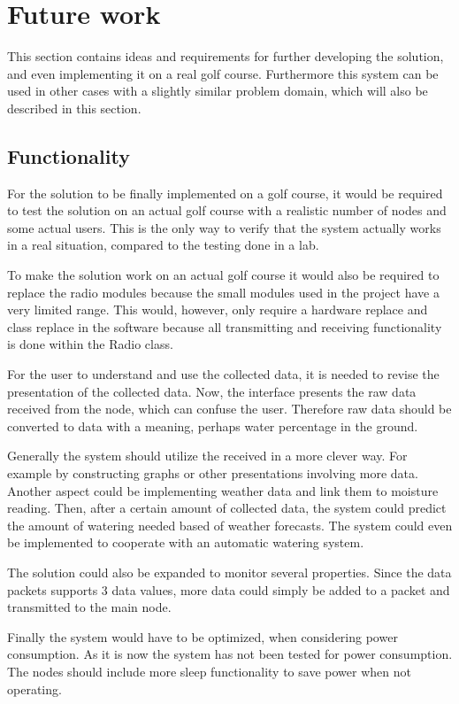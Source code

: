 \section{Future work}
This section contains ideas and requirements for further developing the solution, and even implementing it on a real golf course. Furthermore this system can be used in other cases with a slightly similar problem domain, which will also be described in this section.

\subsection{Functionality}
For the solution to be finally implemented on a golf course, it would be required to test the solution on an actual golf course with a realistic number of nodes and some actual users. This is the only way to verify that the system actually works in a real situation, compared to the testing done in a lab.

To make the solution work on an actual golf course it would also be required to replace the radio modules because the small modules used in the project have a very limited range. This would, however, only require a hardware replace and class replace in the software because all transmitting and receiving functionality is done within the Radio class.

For the user to understand and use the collected data, it is needed to revise the presentation of the collected data. Now, the interface presents the raw data received from the node, which can confuse the user. Therefore raw data should be converted to data with a meaning, perhaps water percentage in the ground.

Generally the system should utilize the received in a more clever way. For example by constructing graphs or  other presentations involving more data. Another aspect could be implementing weather data and link them to moisture reading. Then, after a certain amount of collected data, the system could predict the amount of watering needed based of weather forecasts. The system could even be implemented to cooperate with an automatic watering system.

The solution could also be expanded to monitor several properties. Since the data packets supports 3 data values, more data could simply be added to a packet and transmitted to the main node.

Finally the system would have to be optimized, when considering power consumption. As it is now the system has not been tested for power consumption. The nodes should include more sleep functionality to save power when not operating.

